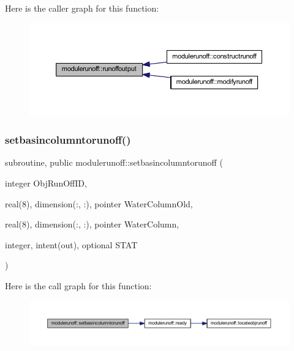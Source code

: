Here is the caller graph for this function\+:
\nopagebreak
\begin{figure}[H]
\begin{center}
\leavevmode
\includegraphics[width=350pt]{namespacemodulerunoff_af0c6bd2433c33b62204214405fa2bd23_icgraph}
\end{center}
\end{figure}
\mbox{\label{namespacemodulerunoff_a1bdc99360bd152034690c7eed836b2cf}} 
\subsubsection{\texorpdfstring{setbasincolumntorunoff()}{setbasincolumntorunoff()}}
{\footnotesize\ttfamily subroutine, public modulerunoff\+::setbasincolumntorunoff (\begin{DoxyParamCaption}\item[{integer}]{Obj\+Run\+Off\+ID,  }\item[{real(8), dimension(\+:, \+:), pointer}]{Water\+Column\+Old,  }\item[{real(8), dimension(\+:, \+:), pointer}]{Water\+Column,  }\item[{integer, intent(out), optional}]{S\+T\+AT }\end{DoxyParamCaption})}

Here is the call graph for this function\+:
\nopagebreak
\begin{figure}[H]
\begin{center}
\leavevmode
\includegraphics[width=350pt]{namespacemodulerunoff_a1bdc99360bd152034690c7eed836b2cf_cgraph}
\end{center}
\end{figure}
\mbox{\label{namespacemodulerunoff_a94b297f6c1f0a65686f92178ebe5d5c2}} 
